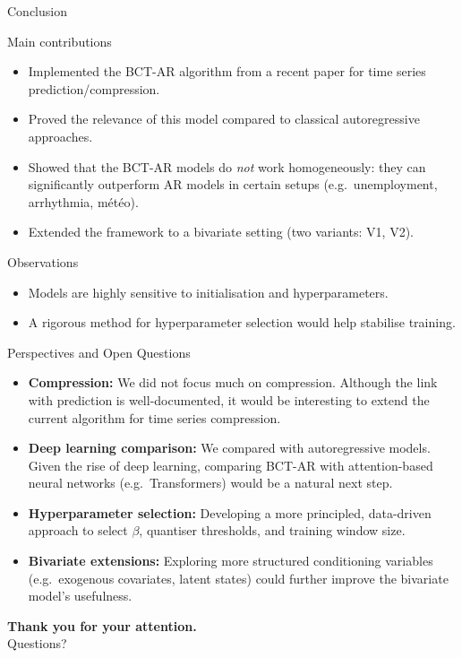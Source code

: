 \documentclass[10pt]{beamer}
\begin{document}
\begin{frame}{Conclusion}
\begin{block}{Main contributions}
\begin{itemize}
    \item Implemented the BCT-AR algorithm from a recent paper for time series prediction/compression.
    \item Proved the relevance of this model compared to classical autoregressive approaches.
    \item Showed that the BCT-AR models do \emph{not} work homogeneously: they can significantly outperform AR models in certain setups (e.g.\ unemployment, arrhythmia, météo).
    \item Extended the framework to a bivariate setting (two variants: V1, V2).
\end{itemize}
\end{block}

\begin{block}{Observations}
\begin{itemize}
    \item Models are highly sensitive to initialisation and hyperparameters.
    \item A rigorous method for hyperparameter selection would help stabilise training.
\end{itemize}
\end{block}
\end{frame}

\begin{frame}{Perspectives and Open Questions}
\begin{itemize}
    \item \textbf{Compression:} We did not focus much on compression. Although the link with prediction is well-documented, it would be interesting to extend the current algorithm for time series compression.

    \item \textbf{Deep learning comparison:} We compared with autoregressive models. Given the rise of deep learning, comparing BCT-AR with attention-based neural networks (e.g.\ Transformers) would be a natural next step.

    \item \textbf{Hyperparameter selection:} Developing a more principled, data-driven approach to select $\beta$, quantiser thresholds, and training window size.

    \item \textbf{Bivariate extensions:} Exploring more structured conditioning variables (e.g.\ exogenous covariates, latent states) could further improve the bivariate model's usefulness.
\end{itemize}
\end{frame}

\begin{frame}{}
\centering
\vspace{1.5cm}
{\Large \textbf{Thank you for your attention.}}\\[1.5em]
Questions?
\end{frame}
\end{document}
